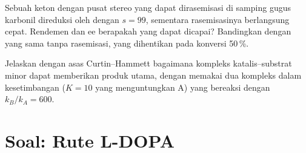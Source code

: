 \begin{exercise}[$\star\star\star$]\label{exo:b3:asymmetric-synthesis:11}
Sebuah keton dengan pusat stereo yang dapat dirasemisasi di samping gugus karbonil direduksi oleh
 dengan $s = 99$, sementara rasemisasinya berlangsung cepat. Rendemen dan ee berapakah yang dapat
dicapai? Bandingkan dengan  yang sama tanpa rasemisasi, yang dihentikan pada konversi 50\,\%.
\end{exercise}

\begin{exercise}[$\star\star\star$]\label{exo:b3:asymmetric-synthesis:12}
Jelaskan dengan asas Curtin--Hammett bagaimana kompleks katalis--substrat minor
dapat memberikan produk utama, dengan memakai dua kompleks dalam kesetimbangan
($K = 10$ yang menguntungkan A) yang bereaksi dengan $k_B/k_A = 600$.
\end{exercise}

\section{Soal: Rute L-DOPA}

